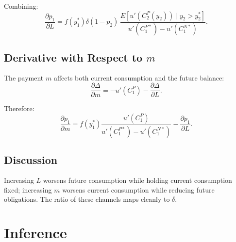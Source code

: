 \documentclass[12pt,english]{article}
\begin{document}
Combining:
\[
\boxed{
\frac{\partial p_1}{\partial L}
=
f(y_1^*) \delta (1-p_2)\,
\frac{E[u'(C_2^P(y_2)) \mid y_2>y_2^*]}
{u'(C_1^{P*}) - u'(C_1^{N*})}.
}
\]

\subsection{Derivative with Respect to $m$}

The payment $m$ affects both current consumption and the future balance:
\[
\frac{\partial \Delta}{\partial m}
=
- u'(C_1^P)
- \frac{\partial \Delta}{\partial L}.
\]

Therefore:
\[
\boxed{
\frac{\partial p_1}{\partial m}
=
f(y_1^*)\frac{u'(C_1^P)}{u'(C_1^{P*}) - u'(C_1^{N*})}
-
\frac{\partial p_1}{\partial L}.
}
\]

\subsection{Discussion}

Increasing $L$ worsens future consumption while holding current consumption fixed; increasing $m$ worsens current consumption while reducing future obligations. The ratio of these channels maps cleanly to $\delta$.












\section{Inference}\label{appendix:delta_method}
\end{document}
